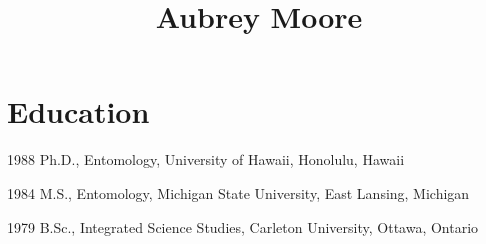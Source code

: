\documentclass[12pt,english]{simplecv}
\begin{document}


\title{Aubrey Moore}
\maketitle

\section{Education}
\begin{topic}
\item [{1988}]Ph.D., Entomology, University of Hawaii, Honolulu, Hawaii
\item [{1984}] M.S., Entomology, Michigan State University, East Lansing, Michigan
\item [{1979}] B.Sc., Integrated Science Studies, Carleton University, Ottawa, Ontario 
\end{topic}
\end{document}

